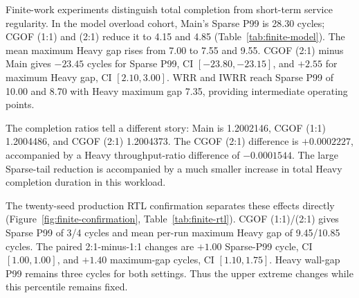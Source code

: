 Finite-work experiments distinguish total completion from short-term service regularity. In the model overload cohort, Main's Sparse P99 is 28.30 cycles; CGOF (1:1) and (2:1) reduce it to 4.15 and 4.85 (Table~\ref{tab:finite-model}). The mean maximum Heavy gap rises from 7.00 to 7.55 and 9.55. CGOF (2:1) minus Main gives $-23.45$ cycles for Sparse P99, CI $[-23.80,-23.15]$, and $+2.55$ for maximum Heavy gap, CI $[2.10,3.00]$. WRR and IWRR reach Sparse P99 of 10.00 and 8.70 with Heavy maximum gap 7.35, providing intermediate operating points.

The completion ratios tell a different story: Main is 1.2002146, CGOF (1:1) 1.2004486, and CGOF (2:1) 1.2004373. The CGOF (2:1) difference is $+0.0002227$, accompanied by a Heavy throughput-ratio difference of $-0.0001544$. The large Sparse-tail reduction is accompanied by a much smaller increase in total Heavy completion duration in this workload.

The twenty-seed production RTL confirmation separates these effects directly (Figure~\ref{fig:finite-confirmation}, Table~\ref{tab:finite-rtl}). CGOF (1:1)/(2:1) gives Sparse P99 of 3/4 cycles and mean per-run maximum Heavy gap of 9.45/10.85 cycles. The paired 2:1-minus-1:1 changes are $+1.00$ Sparse-P99 cycle, CI $[1.00,1.00]$, and $+1.40$ maximum-gap cycles, CI $[1.10,1.75]$. Heavy wall-gap P99 remains three cycles for both settings. Thus the upper extreme changes while this percentile remains fixed.


